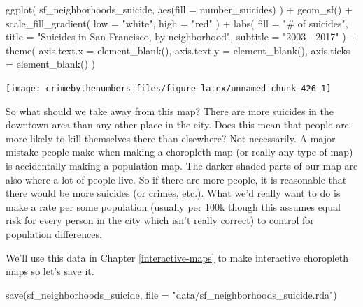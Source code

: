 \documentclass[
]{krantz}
\makeatletter
\newenvironment{Shaded}{\begin{snugshade}}{\end{snugshade}}
\newcommand{\AttributeTok}[1]{\textcolor[rgb]{0.61,0.61,0.61}{#1}}
\newcommand{\FunctionTok}[1]{\textcolor[rgb]{0,0,0}{#1}}
\newcommand{\NormalTok}[1]{#1}
\newcommand{\SpecialCharTok}[1]{\textcolor[rgb]{0,0,0}{#1}}
\newcommand{\StringTok}[1]{\textcolor[rgb]{0.5,0.5,0.5}{#1}}
\newenvironment{kframe}{%
\medskip{}
\setlength{\fboxsep}{.8em}
 \def\at@end@of@kframe{}%
 \ifinner\ifhmode%
  \def\at@end@of@kframe{\end{minipage}}%
  \begin{minipage}{\columnwidth}%
 \fi\fi%
 \def\FrameCommand##1{\hskip\@totalleftmargin \hskip-\fboxsep
 \colorbox{shadecolor}{##1}\hskip-\fboxsep
     \hskip-\linewidth \hskip-\@totalleftmargin \hskip\columnwidth}%
 \MakeFramed {\advance\hsize-\width
   \@totalleftmargin\z@ \linewidth\hsize
   \@setminipage}}%
 {\par\unskip\endMakeFramed%
 \at@end@of@kframe}
\renewenvironment{Shaded}{\begin{kframe}}{\end{kframe}}
\makeatother
\begin{document}
\begin{Shaded}
\begin{Highlighting}[]
\FunctionTok{ggplot}\NormalTok{(}
\NormalTok{  sf\_neighborhoods\_suicide,}
  \FunctionTok{aes}\NormalTok{(}\AttributeTok{fill =}\NormalTok{ number\_suicides)}
\NormalTok{) }\SpecialCharTok{+}
  \FunctionTok{geom\_sf}\NormalTok{() }\SpecialCharTok{+}
  \FunctionTok{scale\_fill\_gradient}\NormalTok{(}
    \AttributeTok{low =} \StringTok{"white"}\NormalTok{,}
    \AttributeTok{high =} \StringTok{"red"}
\NormalTok{  ) }\SpecialCharTok{+}
  \FunctionTok{labs}\NormalTok{(}
    \AttributeTok{fill =} \StringTok{"\# of suicides"}\NormalTok{,}
    \AttributeTok{title =} \StringTok{"Suicides in San Francisco, by neighborhood"}\NormalTok{,}
    \AttributeTok{subtitle =} \StringTok{"2003 {-} 2017"}
\NormalTok{  ) }\SpecialCharTok{+}
  \FunctionTok{theme}\NormalTok{(}
    \AttributeTok{axis.text.x =} \FunctionTok{element\_blank}\NormalTok{(),}
    \AttributeTok{axis.text.y =} \FunctionTok{element\_blank}\NormalTok{(),}
    \AttributeTok{axis.ticks =} \FunctionTok{element\_blank}\NormalTok{()}
\NormalTok{  )}
\end{Highlighting}
\end{Shaded}

\begin{center}\texttt{[image: crimebythenumbers\_files/figure-latex/unnamed-chunk-426-1]} \end{center}

So what should we take away from this map? There are more
suicides in the downtown area than any other place in the
city. Does this mean that people are more likely to kill
themselves there than elsewhere? Not necessarily. A major
mistake people make when making a choropleth map (or really
any type of map) is accidentally making a population map.
The darker shaded parts of our map are also where a lot of
people live. So if there are more people, it is reasonable
that there would be more suicides (or crimes, etc.). What
we'd really want to do is make a rate per some population
(usually per 100k though this assumes equal risk for every
person in the city which isn't really correct) to control
for population differences.

We'll use this data in Chapter \ref{interactive-maps} to
make interactive choropleth maps so let's save it.

\begin{Shaded}
\begin{Highlighting}[]
\FunctionTok{save}\NormalTok{(sf\_neighborhoods\_suicide, }\AttributeTok{file =} \StringTok{"data/sf\_neighborhoods\_suicide.rda"}\NormalTok{)}
\end{Highlighting}
\end{Shaded}
\end{document}
